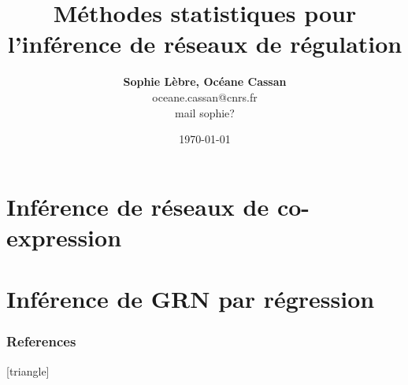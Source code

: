\documentclass[xcolor=dvipsnames]{beamer}
\title[L'inférence statistique de GRN]{Méthodes statistiques pour l'inférence de réseaux de régulation}
\date{\today}
\author[Sophie Lèbre, Océane Cassan]
{\textbf{Sophie Lèbre, Océane Cassan} \\ oceane.cassan@cnrs.fr \\ mail sophie?}
\institute[]{
BFP M1, Parcours Bipa}
\begin{document}
	
	\begin{frame}
		\titlepage
	\end{frame}
	
	\begin{frame}
		\tableofcontents
	\end{frame}
	
	

    
    
\section{Inférence de réseaux de co-expression}


    	

    	
\section{Inférence de GRN par régression}


    
	
	
	
	
	
	
	


\begin{frame}[allowframebreaks]
    \frametitle{References}
    [triangle]
    \scriptsize
    
    
\end{frame}
\end{document}
